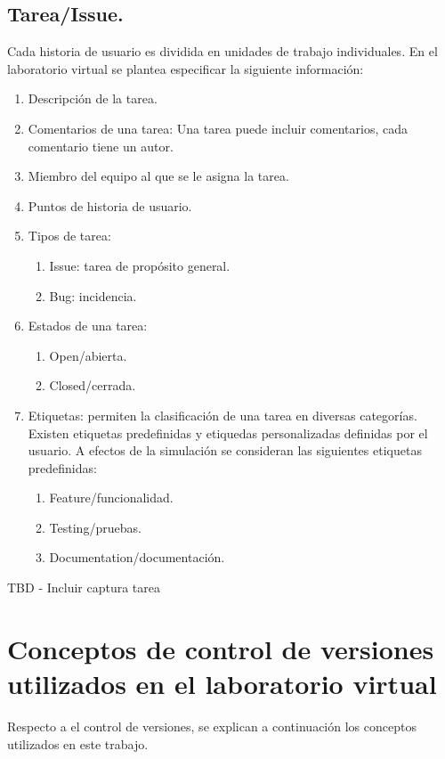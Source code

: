 \subsection{Tarea/Issue.}

Cada historia de usuario es dividida en unidades de trabajo individuales. En el laboratorio virtual se plantea especificar la siguiente información:

\begin{enumerate}
	\item Descripción de la tarea.
	\item Comentarios de una tarea: Una tarea puede incluir comentarios, cada comentario tiene un autor.
	\item Miembro del equipo al que se le asigna la tarea.
	\item Puntos de historia de usuario.
	\item Tipos de tarea:
		\begin{enumerate}
			\item Issue: tarea de propósito general.
			\item Bug: incidencia.
		\end{enumerate}
	\item Estados de una tarea:
		\begin{enumerate}
			\item Open/abierta.
			\item Closed/cerrada.
		\end{enumerate}
	\item Etiquetas: permiten la clasificación de una tarea en diversas categorías. Existen etiquetas predefinidas y etiquedas personalizadas definidas por el usuario. A efectos de la simulación se consideran las siguientes etiquetas predefinidas:	
		\begin{enumerate}
			\item Feature/funcionalidad.
			\item Testing/pruebas.
			\item Documentation/documentación.
		\end{enumerate}
\end{enumerate}

TBD - Incluir captura tarea

\section{Conceptos de control de versiones utilizados en el laboratorio virtual}

Respecto a el control de versiones, se explican a continuación los conceptos utilizados en este trabajo.

